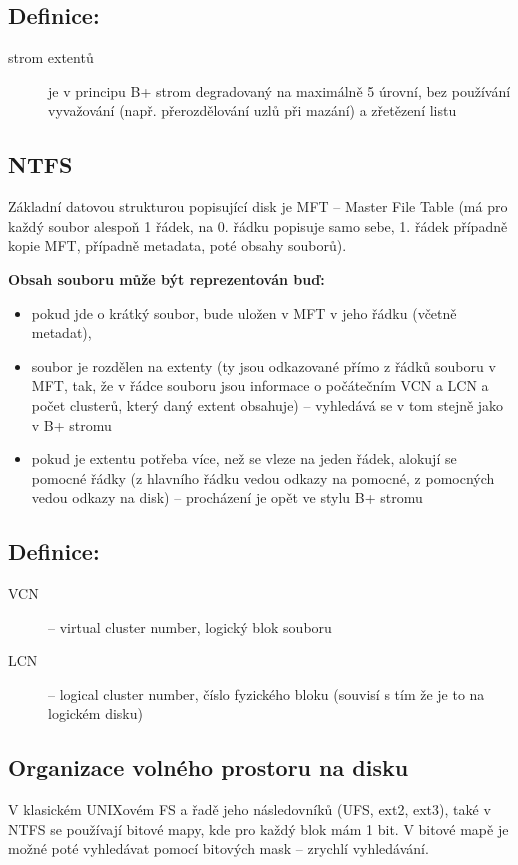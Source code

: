 \documentclass[a4paper, 11pt]{article}
\begin{document}
\subsection*{Definice:}
\begin{description}
\item[strom extentů] je v principu B+ strom degradovaný na maximálně 5 úrovní, bez používání vyvažování (např. přerozdělování uzlů při mazání) a zřetězení listu
\end{description}

\subsection{NTFS}
Základní datovou strukturou popisující disk je MFT -- Master File Table (má pro každý soubor alespoň 1 řádek, na 0. řádku popisuje samo sebe, 1. řádek případně kopie MFT, případně metadata, poté obsahy souborů).
 
\textbf{Obsah souboru může být reprezentován buď:}
\begin{itemize}
    \item pokud jde o krátký soubor, bude uložen v MFT v jeho řádku (včetně metadat),
    \item soubor je rozdělen na extenty (ty jsou odkazované přímo z řádků souboru v MFT, tak, že v řádce souboru jsou informace o počátečním VCN a LCN a počet clusterů, který daný extent obsahuje) -- vyhledává se v tom stejně jako v B+ stromu
    \item pokud je extentu potřeba více, než se vleze na jeden řádek, alokují se pomocné řádky (z hlavního řádku vedou odkazy na pomocné, z pomocných vedou odkazy na disk) -- procházení je opět ve stylu B+ stromu
\end{itemize}
 
\subsection*{Definice:}
\begin{description}
\item[VCN] -- virtual cluster number, logický blok souboru 
\item[LCN] -- logical cluster number, číslo fyzického bloku (souvisí s tím že je to na logickém disku)
\end{description}

\subsection{Organizace volného prostoru na disku}
V klasickém UNIXovém FS a řadě jeho následovníků (UFS, ext2, ext3), také v NTFS se používají bitové mapy, kde pro každý blok mám 1 bit. V bitové mapě je možné poté vyhledávat pomocí bitových mask -- zrychlí vyhledávání.
 
\end{document}
